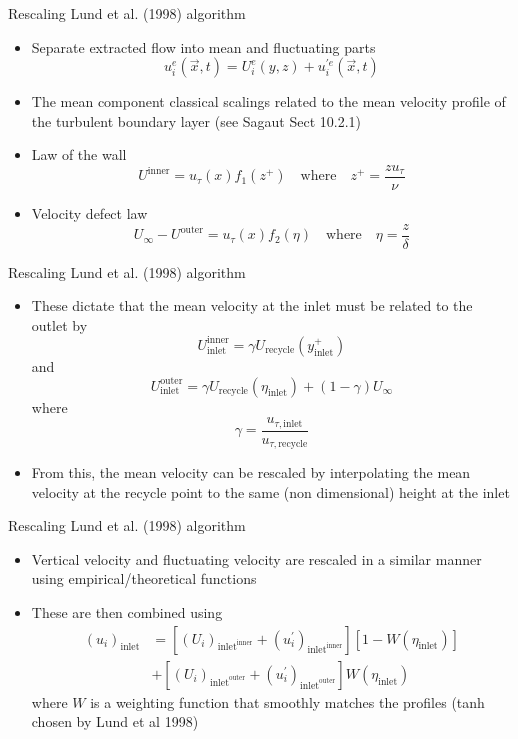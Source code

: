 \begin{frame}{Rescaling}
Lund et al. (1998) algorithm
	\begin{itemize}
	\item Separate extracted flow into mean and fluctuating parts
	$$u_i^e (\vec{x},t) = U_i^e(y,z) + u_i^{\prime e} (\vec{x},t)$$
	\item The mean component classical scalings related to the mean velocity profile of the turbulent boundary layer (see Sagaut Sect 10.2.1)
	\item Law of the wall
	$$U^{\text{inner}} = u_\tau (x) f_1(z^+)\quad \text{where} \quad z^+ = \frac{z u_\tau}{\nu}$$
	\item Velocity defect law
	$$U_{\infty} - U^{\text{outer}} = u_\tau (x)f_2(\eta) \quad \text{where} \quad \eta = \frac{z}{\delta}$$
	\end{itemize}
\end{frame}
\begin{frame}{Rescaling}
Lund et al. (1998) algorithm
	\begin{itemize}
	\item These dictate that the mean velocity at the inlet must be related to the outlet by
	$$U_{\text{inlet}}^{\text{inner}} = \gamma U_{\text{recycle}}(y^+_{\text{inlet}})$$
	and
	$$U_{\text{inlet}}^{\text{outer}} = \gamma U_{\text{recycle}}(\eta_{\text{inlet}}) + (1-\gamma)U_{\infty}$$
	where
	$$\gamma = \frac{u_{\tau, \text{inlet}}}{u_{\tau, \text{recycle}}}$$
	\item From this, the mean velocity can be rescaled by interpolating the mean velocity at the recycle point to the same (non dimensional) height at the inlet
	\end{itemize}
\end{frame}
\begin{frame}{Rescaling}
Lund et al. (1998) algorithm
	\begin{itemize}
	\item Vertical velocity and fluctuating velocity are rescaled in a similar manner using empirical/theoretical functions
	\item These are then combined using
	\begin{align*}
	(u_i)_{\text{inlet}} &= \left[ (U_i)_{\text{inlet}^{\text{inner}}} + (u_i^\prime)_{\text{inlet}^{\text{inner}}}\right]\left[1 - W(\eta_\text{inlet})\right]\\
	&+ \left[ (U_i)_{\text{inlet}^{\text{outer}}}+ (u_i^\prime)_{\text{inlet}^{\text{outer}}}\right]W(\eta_\text{inlet})
	\end{align*}
	where $W$ is a weighting function that smoothly matches the profiles (tanh chosen by Lund et al 1998)
	\end{itemize}
\end{frame}
